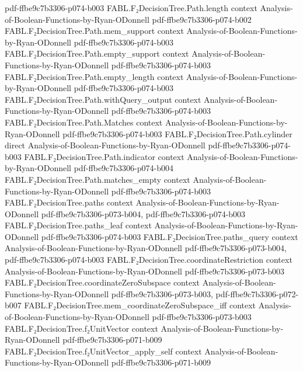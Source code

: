 \begin{theorem}
  {pdf-ffbe9c7b3306-p074-b003}
\proofstep
  {FABL.F₂DecisionTree.Path.length}
  {context}
  {Analysis-of-Boolean-Functions-by-Ryan-ODonnell}
  {pdf-ffbe9c7b3306-p074-b002}
\proofstep
  {FABL.F₂DecisionTree.Path.mem_support}
  {context}
  {Analysis-of-Boolean-Functions-by-Ryan-ODonnell}
  {pdf-ffbe9c7b3306-p074-b003}
\proofstep
  {FABL.F₂DecisionTree.Path.empty_support}
  {context}
  {Analysis-of-Boolean-Functions-by-Ryan-ODonnell}
  {pdf-ffbe9c7b3306-p074-b003}
\proofstep
  {FABL.F₂DecisionTree.Path.empty_length}
  {context}
  {Analysis-of-Boolean-Functions-by-Ryan-ODonnell}
  {pdf-ffbe9c7b3306-p074-b003}
\proofstep
  {FABL.F₂DecisionTree.Path.withQuery_output}
  {context}
  {Analysis-of-Boolean-Functions-by-Ryan-ODonnell}
  {pdf-ffbe9c7b3306-p074-b003}
\proofstep
  {FABL.F₂DecisionTree.Path.Matches}
  {context}
  {Analysis-of-Boolean-Functions-by-Ryan-ODonnell}
  {pdf-ffbe9c7b3306-p074-b003}
\proofstep
  {FABL.F₂DecisionTree.Path.cylinder}
  {direct}
  {Analysis-of-Boolean-Functions-by-Ryan-ODonnell}
  {pdf-ffbe9c7b3306-p074-b003}
\proofstep
  {FABL.F₂DecisionTree.Path.indicator}
  {context}
  {Analysis-of-Boolean-Functions-by-Ryan-ODonnell}
  {pdf-ffbe9c7b3306-p074-b004}
\proofstep
  {FABL.F₂DecisionTree.Path.matches_empty}
  {context}
  {Analysis-of-Boolean-Functions-by-Ryan-ODonnell}
  {pdf-ffbe9c7b3306-p074-b003}
\proofstep
  {FABL.F₂DecisionTree.paths}
  {context}
  {Analysis-of-Boolean-Functions-by-Ryan-ODonnell}
  {pdf-ffbe9c7b3306-p073-b004,
    pdf-ffbe9c7b3306-p074-b003}
\proofstep
  {FABL.F₂DecisionTree.paths_leaf}
  {context}
  {Analysis-of-Boolean-Functions-by-Ryan-ODonnell}
  {pdf-ffbe9c7b3306-p074-b003}
\proofstep
  {FABL.F₂DecisionTree.paths_query}
  {context}
  {Analysis-of-Boolean-Functions-by-Ryan-ODonnell}
  {pdf-ffbe9c7b3306-p073-b004,
    pdf-ffbe9c7b3306-p074-b003}
\proofstep
  {FABL.F₂DecisionTree.coordinateRestriction}
  {context}
  {Analysis-of-Boolean-Functions-by-Ryan-ODonnell}
  {pdf-ffbe9c7b3306-p073-b003}
\proofstep
  {FABL.F₂DecisionTree.coordinateZeroSubspace}
  {context}
  {Analysis-of-Boolean-Functions-by-Ryan-ODonnell}
  {pdf-ffbe9c7b3306-p073-b003,
    pdf-ffbe9c7b3306-p072-b007}
\proofstep
  {FABL.F₂DecisionTree.mem_coordinateZeroSubspace_iff}
  {context}
  {Analysis-of-Boolean-Functions-by-Ryan-ODonnell}
  {pdf-ffbe9c7b3306-p073-b003}
\proofstep
  {FABL.F₂DecisionTree.f₂UnitVector}
  {context}
  {Analysis-of-Boolean-Functions-by-Ryan-ODonnell}
  {pdf-ffbe9c7b3306-p071-b009}
\proofstep
  {FABL.F₂DecisionTree.f₂UnitVector_apply_self}
  {context}
  {Analysis-of-Boolean-Functions-by-Ryan-ODonnell}
  {pdf-ffbe9c7b3306-p071-b009}

\end{theorem}
